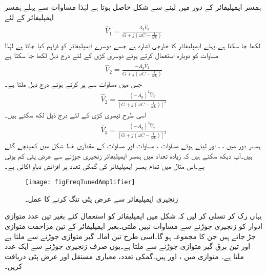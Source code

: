 ہمسر ایمپلیفائر کے دور میں  لینے سے شکل  حاصل ہوتا ہے لہٰذا مساوات  سے پہلے ہمسر ایمپلیفائر کے لئے
\begin{align}\label{مساوات_تعددی_پہلا_ایمپلیفائر}
\hat{V}_1=\frac{-A_g \hat{V}_d}{G+j(\omega C-\frac{1}{\omega L})}
\end{align}
لکھا جا سکتا ہے۔پہلے ایمپلیفائر کا خارجی اشارہ  ہے جسے دوسرے ایمپلیفائر کو فراہم کیا جاتا ہے لہٰذا مساوات  کو دوبارہ استعمال کرتے ہوئے دوسری کڑی کے لئے درج ذیل لکھا جا سکتا ہے
\begin{align*}
\hat{V}_2=\frac{-A_g \hat{V}_1}{G+j(\omega C-\frac{1}{\omega L})}
\end{align*}
جس میں مساوات  سے  پر کرتے ہوئے درج ذیل ملتا ہے۔
\begin{align}\label{مساوات_تعددی_دوسرا_ایمپلیفائر}
\hat{V}_2=\frac{(-A_g)^2 \hat{V}_d}{\left[G+j(\omega C-\frac{1}{\omega L})\right]^2}
\end{align}
اسی طرح تیسری کڑی کے لئے درج ذیل لکھ سکتے ہیں۔
\begin{align}\label{مساوات_تعددی_تیسرا_ایمپلیفائر}
\hat{V}_3=\frac{(-A_g)^3 \hat{V}_d}{\left[G+j(\omega C-\frac{1}{\omega L})\right]^3}
\end{align}
ہمسر دور میں ، ،  اور  لیتے ہوئے مساوات ، مساوات  اور مساوات  کے مقداری خط شکل  میں کھینچے گئے ہیں۔آپ دیکھ سکتے ہیں کہ زیادہ تعداد میں ہمسر ایمپلیفائر زنجیری جوڑنے سے عرض پٹی کم ہوتی ہے۔اس مثال میں تمام ہمسر ایمپلیفائر کی گمکی تعدد پر افزائش دباو اکائی  ہے۔
\begin{figure}
\centering
\texttt{[image: figFreqTunedAmplifier]}
\caption{زنجیری ایمپلیفائر سے عرض پٹی تنگ کرنے کا عمل۔}
\label{شکل_تعددی_زنجیری_تنگ_پٹی}
\end{figure}
یہاں رک کر تسلی کر لیں کہ شکل  میں ایمپلیفائر کو استعمال کئے بغیر تین عدد متوازی  ادوار کو زنجیری جوڑنے سے  مساوات  نہیں ملتی۔بغیر ایمپلیفائر کے تین مزاحمت متوازی جڑ جاتے ہیں جن کا مجموعہ  ہو گا۔اسی طرح تین امالہ گیر متوازی جوڑنے سے  ملتا ہے اور تین برق گیر متوازی جوڑنے سے  ملتا ہے۔یوں صرف  زنجیری جوڑنے سے ایک عدد  ملتا ہے۔
متوازی  میں ،  اور  ہیں۔گمکی تعدد، معیاری مستقل اور عرض پٹی دریافت کریں۔

